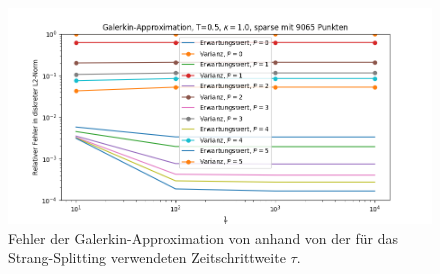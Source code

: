 \begin{figure}
\centering
\includegraphics[width=\textwidth]{Figures/galerkin_trial8_sparse.png}
\caption{Fehler der Galerkin-Approximation von  anhand von der für das Strang-Splitting verwendeten Zeitschrittweite $\tau$.}
\label{fig:galerkin_bydt_trial8}
\end{figure}

